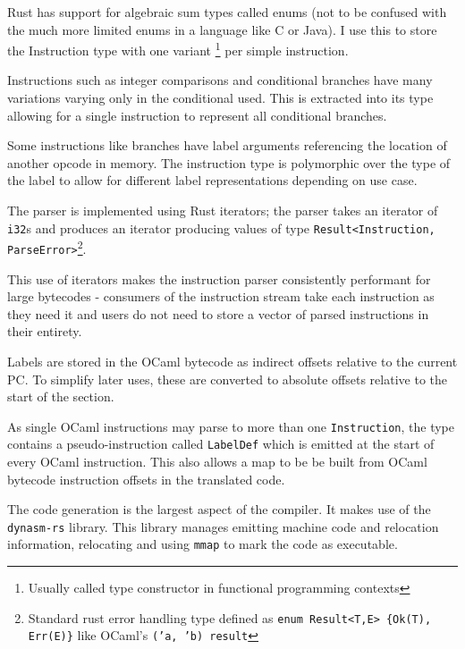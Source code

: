 Rust has support for algebraic sum types called enums (not to be confused with the much more
limited
enums in a language like C or Java). I use this to store the Instruction type with one variant
\footnote{Usually called type constructor in functional programming contexts} per simple
instruction.

Instructions such as integer comparisons and conditional branches have many variations varying only
in the conditional used. This is extracted into its type allowing for a single instruction to
represent
all conditional branches.

Some instructions like branches have label arguments referencing the location of another opcode in
memory. The instruction type is polymorphic over the type of the label to allow for different label
representations depending on use case.


The parser is implemented using Rust iterators; the parser takes an iterator of \texttt{i32}s and
produces an iterator producing values of type \texttt{Result<Instruction,
      ParseError>}\footnote{Standard rust error handling type defined as \texttt{enum Result<T,E>
            \{Ok(T), Err(E)\}} like OCaml's \texttt{('a, 'b) result}}.

This use of iterators makes the instruction parser consistently performant for large bytecodes -
consumers of the instruction stream take each instruction as they need it and users do not need to
store a vector of parsed instructions in their entirety.

Labels are stored in the OCaml bytecode as indirect offsets relative to the current PC. To simplify
later uses, these are converted to absolute offsets relative to the start of the section.

As single OCaml instructions may parse to more than one \texttt{Instruction}, the type
contains a pseudo-instruction called \texttt{LabelDef} which is emitted at
the start of every OCaml instruction. This also allows a map to be be built from OCaml bytecode
instruction offsets in the translated code.


The code generation is the largest aspect of the compiler. It makes use of the \texttt{dynasm-rs}
library. This library manages emitting machine code and relocation information, relocating and
using \texttt{mmap} to mark the code as executable.

